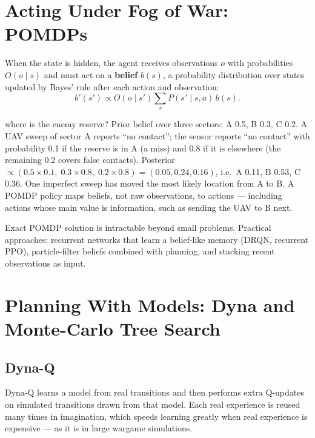 \documentclass[11pt]{article}
\begin{document}
\section{Acting Under Fog of War: POMDPs}
When the state is hidden, the agent receives observations $o$ with probabilities $O(o\mid s)$ and must act on a \textbf{belief} $b(s)$, a probability distribution over states updated by Bayes' rule after each action and observation:
\[b'(s')\propto O(o\mid s')\sum_sP(s'\mid s,a)\,b(s).\]
\begin{example}{where is the enemy reserve?}
Prior belief over three sectors: A 0.5, B 0.3, C 0.2. A UAV sweep of sector A reports ``no contact''; the sensor reports ``no contact'' with probability 0.1 if the reserve is in A (a miss) and 0.8 if it is elsewhere (the remaining 0.2 covers false contacts). Posterior $\propto(0.5\times0.1,\;0.3\times0.8,\;0.2\times0.8)=(0.05,0.24,0.16)$, i.e.\ A 0.11, B 0.53, C 0.36. One imperfect sweep has moved the most likely location from A to B. A POMDP policy maps beliefs, not raw observations, to actions --- including actions whose main value is information, such as sending the UAV to B next.
\end{example}
Exact POMDP solution is intractable beyond small problems. Practical approaches: recurrent networks that learn a belief-like memory (DRQN, recurrent PPO), particle-filter beliefs combined with planning, and stacking recent observations as input.

\section{Planning With Models: Dyna and Monte-Carlo Tree Search}
\subsection{Dyna-Q}
Dyna-Q learns a model from real transitions and then performs extra Q-updates on simulated transitions drawn from that model. Each real experience is reused many times in imagination, which speeds learning greatly when real experience is expensive --- as it is in large wargame simulations.
\end{document}
